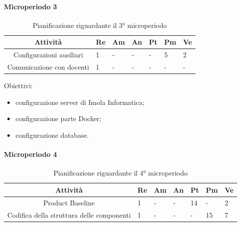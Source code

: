 \paragraph{Microperiodo 3}
\begin{table}[H]
	\centering
	\renewcommand{\arraystretch}{1.5}
	\begin{tabular}{|c|p{10mm}|p{10mm}|p{10mm}|p{10mm}|p{10mm}|p{10mm}|}
		\hline
		\rowcolor{lighter-grayer}
		\textbf{Attività}                         & \textbf{Re} & \textbf{Am} & \textbf{An} & \textbf{Pt} & \textbf{Pm} & \textbf{Ve} \\ \hline
		
		Configurazioni ausiliari & 1           &     -        &       -      &       -      & 5           & 2           \\ \hline
		Comunicazione con docenti  & 1           &     -        &      -       &     -        &      -       &        -     \\ \hline     
		
	\end{tabular}
	\caption{ Pianificazione riguardante il 3° microperiodo\\}
\end{table}

Obiettivi:
\begin{itemize}
	\item configurazione server di Imola Informatica;
	\item configurazione parte Docker;
	\item configurazione database.
\end{itemize}

\paragraph{Microperiodo 4}
\begin{table}[H]
	\centering
	\renewcommand{\arraystretch}{1.5}
	\begin{tabular}{|c|p{10mm}|p{10mm}|p{10mm}|p{10mm}|p{10mm}|p{10mm}|}
		\hline
		\rowcolor{lighter-grayer}
		\textbf{Attività}                         & \textbf{Re} & \textbf{Am} & \textbf{An} & \textbf{Pt} & \textbf{Pm} & \textbf{Ve} \\ \hline
		
		Product Baseline                                        & 1           &     -        &    -         & 14          &    -         & 2           \\ \hline
		Codifica della struttura delle componenti & 1           &     -        &    -         &      -       & 15          & 7           \\ \hline
		
		
	\end{tabular}
	\caption{ Pianificazione riguardante il 4° microperiodo\\}
\end{table}

